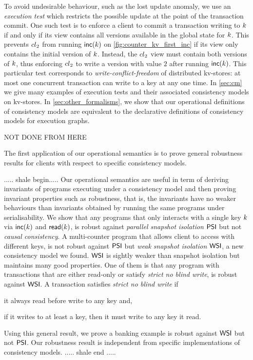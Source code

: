 To avoid undesirable behaviour, such as the lost update anomaly, we
use an {\em execution test} which restricts the possible update at the
point of the transaction commit.  One such test is to enforce a client
to commit a transaction writing to $k$ if and only if its view
contains all versions available in the global state for $k$.  This
prevents ${cl}_2$ from running $\mathsf{inc}(k)$ on
\cref{fig:counter_kv_first_inc} if its view only contains the initial
version of $k$.  Instead, the ${cl}_2$ view must contain both
versions of $k$, thus enforcing ${cl}_2$ to write a version with
value $2$ after running $\mathsf{inc}(k)$. This particular test
corresponds to \emph{write-conflict-freedom} of distributed kv-stores:
at most one concurrent transaction can write to a key at any one time.
In \cref{sec:cm} we give many examples of execution tests and their
associated consistency models on kv-stores. In \cref{sec:other_formalisms}, we
show that our operational definitions of consistency models are
equivalent to the declarative definitions of consistency models for 
execution graphs. 

NOT DONE FROM HERE



The first application of our operational semantics is to prove
general robustness results for clients with respect to specific
consistency models. 

..... shale begin.....
Our operational semantics are useful in term of deriving invariants of programs executing 
under a consistency model and
then proving invariant properties such as robustness, that is, the invariants have no weaker behaviours
than invariants obtained by running the same programs under serialisability.
We show that any programs that only interacts with  
a single key \( k \) via \( \mathsf{inc}(k)\) and \( \mathsf{read}(k)\),
is robust against \emph{parallel snapshot isolation} \( \mathsf{PSI} \) but not \emph{causal consistency}.
A multi-counter program that allows client to access with different keys, is not robust against 
\( \mathsf{PSI} \) but \emph{weak snapshot isolation} \( \mathsf{WSI} \), 
a new consistency model we found.
\( \mathsf{WSI} \) is sightly weaker than snapshot isolation but maintains many good properties.
One of them is that 
any program with transactions that are either read-only or satisfy \emph{strict no blind write},
is robust against \( \mathsf{WSI} \).
A transaction satisfies \emph{strict no blind write} if 
\begin{enumerate*}
    \item it always read before write to any key and,
    \item if it writes to at least a key, then it must write to any key it read.
\end{enumerate*}
Using this general result, 
we prove a banking example \cite{bank-example-wsi} is robust against \( \mathsf{WSI} \) but not \( \mathsf{PSI} \).
Our robustness result is independent from specific implementations of consistency models.
..... shale end .....


